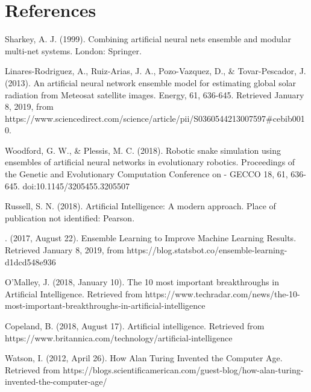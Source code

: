 \documentclass[
a4paper,
11pt,
english
]{report}
\begin{document}

\chapter*{References}
\noindent [1] Sharkey, A. J. (1999). Combining artificial neural nets ensemble and modular multi-net systems. London: Springer.

\noindent [2] Linares-Rodriguez, A., Ruiz-Arias, J. A., Pozo-Vazquez, D., & Tovar-Pescador, J. (2013). An artificial neural network ensemble model for estimating global solar radiation from Meteosat satellite images. Energy, 61, 636-645. Retrieved January 8, 2019, from https://www.sciencedirect.com/science/article/pii/S0360544213007597#cebib0010.

\noindent [3] Woodford, G. W., & Plessis, M. C. (2018). Robotic snake simulation using ensembles of artificial neural networks in evolutionary robotics. Proceedings of the Genetic and Evolutionary Computation Conference on - GECCO 18, 61, 636-645. doi:10.1145/3205455.3205507

\noindent [4] Russell, S. N. (2018). Artificial Intelligence: A modern approach. Place of publication not identified: Pearson.

. (2017, August 22). Ensemble Learning to Improve Machine Learning Results. Retrieved January 8, 2019, from https://blog.statsbot.co/ensemble-learning-d1dcd548e936

\noindent [6] O'Malley, J. (2018, January 10). The 10 most important breakthroughs in Artificial Intelligence. Retrieved from https://www.techradar.com/news/the-10-most-important-breakthroughs-in-artificial-intelligence

\noindent [7] Copeland, B. (2018, August 17). Artificial intelligence. Retrieved from https://www.britannica.com/technology/artificial-intelligence

\noindent [8] Watson, I. (2012, April 26). How Alan Turing Invented the Computer Age. Retrieved from https://blogs.scientificamerican.com/guest-blog/how-alan-turing-invented-the-computer-age/
\end{document}
